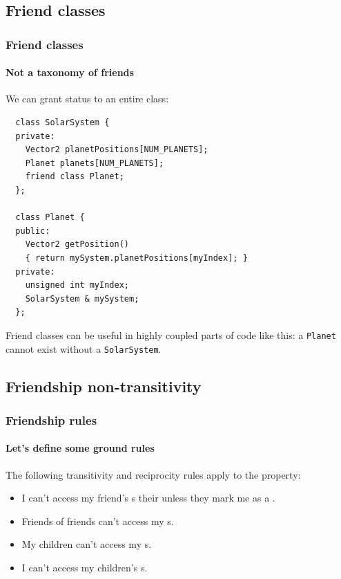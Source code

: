 \documentclass[handout]{beamer}
\begin{document}
\subsection{Friend classes}

\begin{frame}[fragile]
  \frametitle{Friend classes}
  \framesubtitle{Not a taxonomy of friends}
  
  We can grant  status to an entire class:
  \begin{lstlisting}
  class SolarSystem {
  private:
    Vector2 planetPositions[NUM_PLANETS];
    Planet planets[NUM_PLANETS];
    friend class Planet;
  };
  
  class Planet {
  public:
    Vector2 getPosition()
    { return mySystem.planetPositions[myIndex]; }
  private:
    unsigned int myIndex;
    SolarSystem & mySystem;
  };
  \end{lstlisting}
  \pause
  Friend classes can be useful in highly coupled parts of code like this: a \texttt{Planet} cannot exist without a \texttt{SolarSystem}.
  
\end{frame}

\subsection{Friendship non-transitivity}

\begin{frame}
  \frametitle{Friendship rules}
  \framesubtitle{Let's define some ground rules}
  
  The following transitivity and reciprocity rules apply to the  property:
  \begin{itemize}
  	\item<2->{I can't access my friend's s their unless they mark me as a .}
    \item<3->{Friends of friends can't access my s.}
    \item<4->{My children can't access my s.}
    \item<5->{I can't access my children's s.}
  \end{itemize}

\end{frame}  
\end{document}
